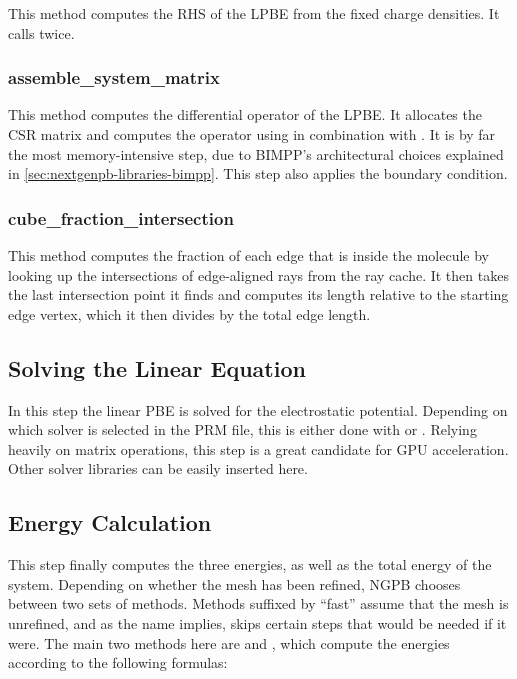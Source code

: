 This method computes the RHS of the LPBE from the fixed charge densities.
It calls  twice.

\subsubsection{assemble\_system\_matrix}

This method computes the differential operator of the LPBE.
It allocates the CSR matrix and computes the operator using  in combination with .
It is by far the most memory-intensive step, due to BIMPP's architectural choices explained in \ref{sec:nextgenpb-libraries-bimpp}.
This step also applies the boundary condition.

\subsubsection{cube\_fraction\_intersection}

This method computes the fraction of each edge that is inside the molecule by looking up the intersections of edge-aligned rays from the ray cache.
It then takes the last intersection point it finds and computes its length relative to the starting edge vertex, which it then divides by the total edge length.

\subsection{Solving the Linear Equation}
\label{sec:nextgenpb-submodules-solve-linear-equation}

In this step the linear PBE is solved for the electrostatic potential.
Depending on which solver is selected in the PRM file, this is either done with  or .
Relying heavily on matrix operations, this step is a great candidate for GPU acceleration.
Other solver libraries can be easily inserted here.

\subsection{Energy Calculation}
\label{sec:nextgenpb-submodules-energy-calculation}

This step finally computes the three energies, as well as the total energy of the system.
Depending on whether the mesh has been refined, NGPB chooses between two sets of methods.
Methods suffixed by ``fast'' assume that the mesh is unrefined, and as the name implies, skips certain steps that would be needed if it were.
The main two methods here are  and , which compute the energies according to the following formulas:

